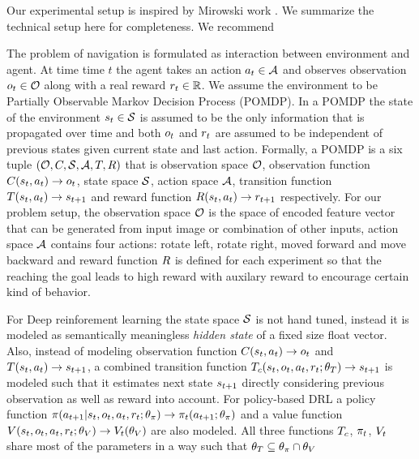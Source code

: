 Our experimental setup is inspired by Mirowski \etal{} work \cite{MiPaViICLR2017}. We summarize the technical setup here for completeness. We recommend \cite{MnBaMiICML2016,MnBaMiICML2016,MiPaViICLR2017}

The problem of navigation is formulated as interaction between environment and agent. At time time $t$ the agent takes an action $a_t \in \mathcal{A}$ and observes observation $o_t \in \mathcal{O}$ along with a real reward $r_t \in \mathbb{R}$.
We assume the environment to be Partially Observable Markov Decision Process (POMDP).
In a POMDP the state of the environment $s_t \in \mathcal{S}$ is assumed to be the only information that is propagated over time and both $o_t$ and $r_t$ are assumed to be independent of previous states given current state and last action. Formally, a POMDP is a six tuple $(\mathcal{O}, C, \mathcal{S}, \mathcal{A}, T, R)$ that is observation space $\mathcal{O}$, observation function $C(s_t, a_t) \rightarrow o_t$, state space $\mathcal{S}$, action space $\mathcal{A}$, transition function $T(s_t, a_t) \rightarrow s_{t+1}$ and reward function $R(s_t, a_t) \rightarrow r_{t+1}$ respectively.
For our problem setup, the observation space $\mathcal{O}$ is the space of encoded feature vector that can be generated from input image or combination of other inputs, action space $\mathcal{A}$ contains four actions: rotate left, rotate right, moved forward and move backward and reward function $R$ is defined for each experiment so that the reaching the goal leads to high reward with auxilary reward to encourage certain kind of behavior.

For Deep reinforement learning the state space $\mathcal{S}$ is not hand tuned, instead it is modeled as semantically meaningless \emph{hidden state} of a fixed size float vector.
Also, instead of modeling observation function $C(s_t, a_t) \rightarrow o_t$ and $T(s_t, a_t) \rightarrow s_{t+1}$, a combined transition function $T_c(s_t, o_t, a_t, r_t; \theta_T) \rightarrow s_{t+1}$ is modeled such that it estimates next state $s_{t+1}$ directly considering previous observation as well as reward into account. For policy-based DRL a policy function $\pi(a_{t+1}|s_t, o_t, a_t, r_t; \theta_\pi) \rightarrow \pi_t(a_{t+1} ; \theta_\pi)$ and a value function $V(s_t, o_t, a_t, r_t; \theta_V) \rightarrow V_t(\theta_V)$ are also modeled. All three functions $T_c$, $\pi_t$, $V_t$ share most of the parameters in a way such that $\theta_T \subseteq \theta_{\pi} \cap \theta_V$

